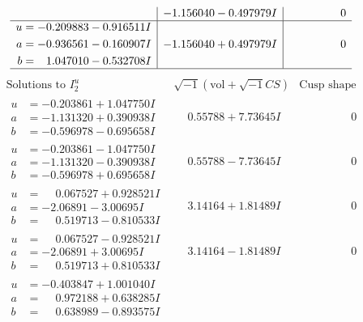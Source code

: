 \documentclass[1p]{elsarticle_modified}
\theoremstyle{definition}
\newcommand{\I}{\sqrt{-1}}
\begin{document}
$$\begin{array}{c|c|c}
 & -1.156040 - 0.497979 I & \phantom{-0.000000 } 0 \\ \hline\begin{aligned}
u &= -0.209883 - 0.916511 I \\
a &= -0.936561 - 0.160907 I \\
b &= \phantom{-}1.047010 - 0.532708 I\end{aligned}
 & -1.156040 + 0.497979 I & \phantom{-0.000000 } 0\\
 \hline 
 \end{array}$$\newpage$$\begin{array}{c|c|c}  
\text{Solutions to }I^u_{2}& \I (\text{vol} + \sqrt{-1}CS) & \text{Cusp shape}\\
 \hline 
\begin{aligned}
u &= -0.203861 + 1.047750 I \\
a &= -1.131320 + 0.390938 I \\
b &= -0.596978 - 0.695658 I\end{aligned}
 & \phantom{-}0.55788 + 7.73645 I & \phantom{-0.000000 } 0 \\ \hline\begin{aligned}
u &= -0.203861 - 1.047750 I \\
a &= -1.131320 - 0.390938 I \\
b &= -0.596978 + 0.695658 I\end{aligned}
 & \phantom{-}0.55788 - 7.73645 I & \phantom{-0.000000 } 0 \\ \hline\begin{aligned}
u &= \phantom{-}0.067527 + 0.928521 I \\
a &= -2.06891 - 3.00695 I \\
b &= \phantom{-}0.519713 - 0.810533 I\end{aligned}
 & \phantom{-}3.14164 + 1.81489 I & \phantom{-0.000000 } 0 \\ \hline\begin{aligned}
u &= \phantom{-}0.067527 - 0.928521 I \\
a &= -2.06891 + 3.00695 I \\
b &= \phantom{-}0.519713 + 0.810533 I\end{aligned}
 & \phantom{-}3.14164 - 1.81489 I & \phantom{-0.000000 } 0 \\ \hline\begin{aligned}
u &= -0.403847 + 1.001040 I \\
a &= \phantom{-}0.972188 + 0.638285 I \\
b &= \phantom{-}0.638989 - 0.893575 I\end{aligned}

\end{array}$$
\end{document}
